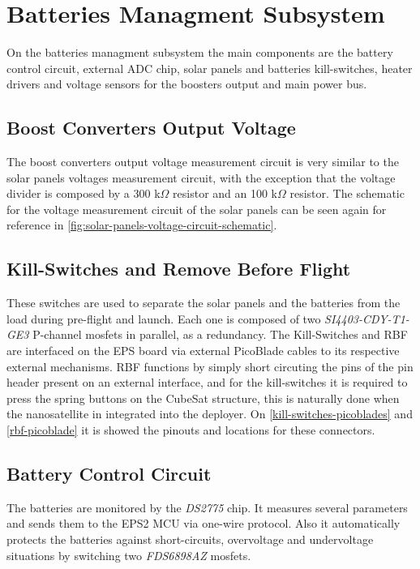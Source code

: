\section{Batteries Managment Subsystem}

On the batteries managment subsystem the main components are the battery control circuit, external ADC chip, solar panels and batteries kill-switches, heater drivers and voltage sensors for the boosters output and main power bus. 

\subsection{Boost Converters Output Voltage}

The boost converters output voltage measurement circuit is very similar to the solar panels voltages measurement circuit, with the exception that the voltage divider is composed by a 300 k$\Omega$ resistor and an 100 k$\Omega$ resistor.
The schematic for the voltage measurement circuit of the solar panels can be seen again for reference in \autoref{fig:solar-panels-voltage-circuit-schematic}.

\subsection{Kill-Switches and Remove Before Flight}

These switches are used to separate the solar panels and the batteries from the load during pre-flight and launch. Each one is composed of two \textit{SI4403-CDY-T1-GE3} P-channel mosfets in parallel, as a redundancy.
The Kill-Switches and RBF are interfaced on the EPS board via external PicoBlade cables to its respective external mechanisms. RBF functions by simply short circuting the pins of the pin header present on an external interface\cite{iip}, and for the kill-switches it is required to press the spring buttons on the CubeSat structure, this is naturally done when the nanosatellite in integrated into the deployer.
On \autoref{kill-switches-picoblades} and \autoref{rbf-picoblade} it is showed the pinouts and locations for these connectors.

\subsection{Battery Control Circuit}

The batteries are monitored by the \textit{DS2775} chip. It measures several parameters and sends them to the EPS2 MCU via one-wire protocol. Also it automatically protects the batteries against short-circuits, overvoltage and undervoltage situations by switching two \textit{FDS6898AZ} mosfets.

